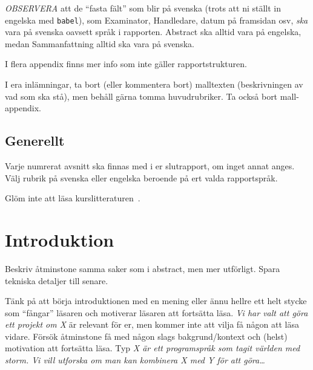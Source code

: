 \documentclass[swedish, a4paper,12pt]{article}
\begin{document}
\emph{OBSERVERA} att de ``fasta fält'' som blir på svenska (trots att ni ställt in engelska med \texttt{babel}), som Examinator, Handledare, datum på framsidan osv, \emph{ska} vara på svenska oavsett språk i rapporten. Abstract ska alltid vara på engelska, medan Sammanfattning alltid ska vara på svenska.

I flera appendix finns mer info som inte gäller rapportstrukturen.

I era inlämningar, ta bort (eller kommentera bort) malltexten (beskrivningen av vad som ska stå), men behåll gärna tomma huvudrubriker. Ta också bort mall-appendix.

\subsection*{Generellt}
Varje numrerat avsnitt ska finnas med i er slutrapport, om inget annat anges.
Välj rubrik på svenska eller engelska beroende på ert valda rapportspråk.

Glöm inte att läsa kurslitteraturen~\cite{dawson:projects-in-computing,dawson:projects-in-computing-old}.
\fi




\section{Introduktion}
\iffalse Beskriv åtminstone samma saker som i abstract, men mer utförligt. Spara tekniska detaljer till senare.

Tänk på att börja introduktionen med en mening eller ännu hellre ett helt stycke som ``fångar'' läsaren och motiverar läsaren att fortsätta läsa.  \emph{Vi har valt att göra ett projekt om X} är relevant för er, men kommer inte att vilja få någon att läsa vidare.  Försök åtminstone få med någon slags bakgrund/kontext och (helst) motivation att fortsätta läsa.  Typ \emph{X är ett programspråk som tagit världen med storm.  Vi vill utforska om man kan kombinera X med Y för att göra\ldots}
\end{document}

